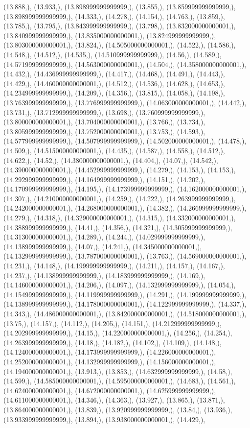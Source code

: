 \documentclass{article}
\begin{document}
(13.888,), (13.933,), (13.898999999999999,), (13.855,), (13.859999999999999,), (13.898999999999999,), (14.333,), (14.278,), (14.154,), (14.763,), (13.859,), (13.785,), (13.795,), (13.843999999999999,), (13.798,), (13.832000000000001,), (13.840999999999999,), (13.835000000000001,), (13.824999999999999,), (13.803000000000001,), (13.824,), (14.505000000000001,), (14.522,), (14.586,), (14.548,), (14.512,), (14.535,), (14.510999999999999,), (14.56,), (14.589,), (14.571999999999999,), (14.563000000000001,), (14.504,), (14.358000000000001,), (14.432,), (14.436999999999999,), (14.417,), (14.468,), (14.491,), (14.443,), (14.429,), (14.460000000000001,), (14.512,), (14.536,), (14.628,), (14.653,), (14.234999999999999,), (14.209,), (14.356,), (13.815,), (14.058,), (14.198,), (13.763999999999999,), (13.776999999999999,), (14.063000000000001,), (14.442,), (13.731,), (13.712999999999999,), (13.698,), (13.760999999999999,), (13.800000000000001,), (13.704000000000001,), (13.766,), (13.734,), (13.805999999999999,), (13.752000000000001,), (13.753,), (14.593,), (14.577999999999999,), (14.507999999999999,), (14.502000000000001,), (14.478,), (14.509,), (14.515000000000001,), (14.435,), (14.587,), (14.558,), (14.512,), (14.622,), (14.52,), (14.380000000000001,), (14.404,), (14.07,), (14.542,), (14.390000000000001,), (14.452999999999999,), (14.279,), (14.153,), (14.153,), (14.292999999999999,), (14.164999999999999,), (14.151,), (14.202,), (14.170999999999999,), (14.195,), (14.173999999999999,), (14.162000000000001,), (14.307,), (14.210000000000001,), (14.259,), (14.222,), (14.263999999999999,), (14.242000000000001,), (14.268000000000001,), (14.382,), (14.266999999999999,), (14.279,), (14.318,), (14.329000000000001,), (14.315,), (14.332000000000001,), (14.388999999999999,), (14.41,), (14.356,), (14.321,), (14.305999999999999,), (14.313000000000001,), (14.289,), (14.244,), (14.029999999999999,), (14.138999999999999,), (14.07,), (14.241,), (14.345000000000001,), (14.132999999999999,), (13.787000000000001,), (13.763,), (14.569000000000001,), (14.231,), (14.148,), (14.199999999999999,), (14.211,), (14.157,), (14.167,), (14.237,), (14.138999999999999,), (14.183999999999999,), (14.169,), (14.146000000000001,), (14.206,), (14.097,), (14.132999999999999,), (14.054,), (14.154999999999999,), (14.119999999999999,), (14.291,), (14.199999999999999,), (14.138999999999999,), (14.178000000000001,), (14.122999999999999,), (14.337,), (14.343,), (14.486000000000001,), (13.842000000000001,), (14.518000000000001,), (13.75,), (14.157,), (14.112,), (14.205,), (14.151,), (14.212999999999999,), (14.202999999999999,), (14.15,), (14.220000000000001,), (14.256,), (14.254,), (14.263999999999999,), (14.18,), (14.182,), (14.102,), (14.109,), (14.148,), (14.124000000000001,), (14.173999999999999,), (14.226000000000001,), (14.252000000000001,), (14.132999999999999,), (14.156000000000001,), (14.194000000000001,), (13.913,), (13.853,), (14.632999999999999,), (14.58,), (14.599,), (14.585000000000001,), (14.595000000000001,), (14.683,), (14.561,), (14.624000000000001,), (14.672000000000001,), (14.625999999999999,), (14.611000000000001,), (14.346,), (14.363,), (13.927,), (13.865,), (13.871,), (13.864000000000001,), (13.839,), (13.920999999999999,), (13.84,), (13.936,), (13.933999999999999,), (13.894,), (13.938000000000001,), (14.429,), 
\end{document}
